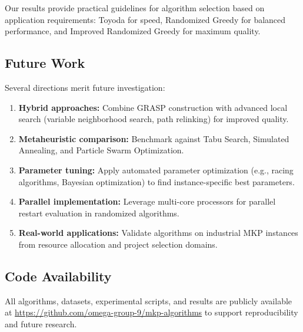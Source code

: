 \documentclass[12pt,a4paper]{article}
\begin{document}
Our results provide practical guidelines for algorithm selection based on application requirements: Toyoda for speed, Randomized Greedy for balanced performance, and Improved Randomized Greedy for maximum quality.

\subsection{Future Work}

Several directions merit future investigation:

\begin{enumerate}
    \item \textbf{Hybrid approaches:} Combine GRASP construction with advanced local search (variable neighborhood search, path relinking) for improved quality.
    \item \textbf{Metaheuristic comparison:} Benchmark against Tabu Search, Simulated Annealing, and Particle Swarm Optimization.
    \item \textbf{Parameter tuning:} Apply automated parameter optimization (e.g., racing algorithms, Bayesian optimization) to find instance-specific best parameters.
    \item \textbf{Parallel implementation:} Leverage multi-core processors for parallel restart evaluation in randomized algorithms.
    \item \textbf{Real-world applications:} Validate algorithms on industrial MKP instances from resource allocation and project selection domains.
\end{enumerate}

\subsection{Code Availability}

All algorithms, datasets, experimental scripts, and results are publicly available at \url{https://github.com/omega-group-9/mkp-algorithms} to support reproducibility and future research.



\end{document}
